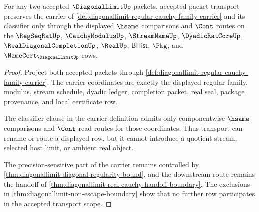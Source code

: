 \begin{theorem}
\label{thm:diagonallimit-obligation-transport-scope}
For any two accepted $\DiagonalLimitUp$ packets, accepted packet transport preserves the carrier of \autoref{def:diagonallimit-regular-cauchy-family-carrier} and its classifier only through the displayed $\hsame$ comparisons and $\Cont$ routes on the $\RegSeqRatUp$, $\CauchyModulusUp$, $\StreamNameUp$, $\DyadicRatCoreUp$, $\RealDiagonalCompletionUp$, $\RealUp$, $\mathsf{BHist}$, $\Pkg$, and $\NameCert_{\DiagonalLimitUp}$ rows.
\end{theorem}
\begin{proof}
Project both accepted packets through \autoref{def:diagonallimit-regular-cauchy-family-carrier}. The carrier coordinates are exactly the displayed regular family, modulus, stream schedule, dyadic ledger, completion packet, real seal, package provenance, and local certificate row.

The classifier clause in the carrier definition admits only componentwise $\hsame$ comparisons and $\Cont$ read routes for those coordinates. Thus transport can rename or route a displayed row, but it cannot introduce a quotient stream, selected host limit, or ambient real object.

The precision-sensitive part of the carrier remains controlled by \autoref{thm:diagonallimit-diagonal-regularity-bound}, and the downstream route remains the handoff of \autoref{thm:diagonallimit-real-cauchy-handoff-boundary}. The exclusions in \autoref{thm:diagonallimit-non-escape-boundary} show that no further row participates in the accepted transport scope.
\end{proof}

